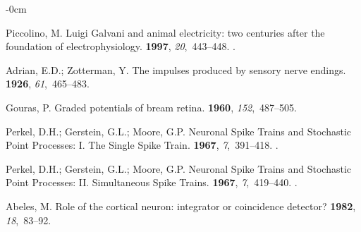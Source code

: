 \documentclass[brainsci, %
               review,accept,pdftex,moreauthors
               ]{Definitions/mdpi}
\begin{document}
\begin{adjustwidth}{-\extralength}{0cm}


%
\begin{thebibliography}{999}

Piccolino, M.
\newblock Luigi {Galvani} and animal electricity: two centuries after the
  foundation of electrophysiology.
 {\bf 1997}, {\em 20},~443--448.
.

Adrian, E.D.; Zotterman, Y.
\newblock The impulses produced by sensory nerve endings.
 {\bf 1926}, {\em 61},~465--483.

Gouras, P.
\newblock Graded potentials of bream retina.
 {\bf 1960}, {\em 152},~487--505.

Perkel, D.H.; Gerstein, G.L.; Moore, G.P.
\newblock Neuronal {Spike} {Trains} and {Stochastic} {Point} {Processes}: {I}.
  {The} {Single} {Spike} {Train}.
 {\bf 1967}, {\em 7},~391--418.
.

Perkel, D.H.; Gerstein, G.L.; Moore, G.P.
\newblock Neuronal {Spike} {Trains} and {Stochastic} {Point} {Processes}: {II}.
  {Simultaneous} {Spike} {Trains}.
 {\bf 1967}, {\em 7},~419--440.
.

Abeles, M.
\newblock Role of the cortical neuron: integrator or coincidence detector?
 {\bf 1982}, {\em
  18},~83--92.


\end{thebibliography}
\end{adjustwidth}
\end{document}
